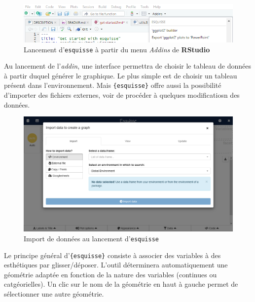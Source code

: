 \documentclass[
  letterpaper,
  DIV=11,
  numbers=noendperiod,
  oneside]{scrreprt}
\begin{document}
\begin{figure}

{\centering \includegraphics{analyses/ressources/esquisse-launch-addin.png}

}

\caption{\label{fig-lancement-esquisse}Lancement d'\texttt{esquisse} à
partir du menu \emph{Addins} de \textbf{RStudio}}

\end{figure}

Au lancement de l'\emph{addin}, une interface permettra de choisir le
tableau de données à partir duquel générer le graphique. Le plus simple
est de choisir un tableau présent dans l'environnement. Mais
\texttt{\{esquisse\}} offre aussi la possibilité d'importer des fichiers
externes, voir de procéder à quelques modificatiosn des données.

\begin{figure}

{\centering \includegraphics{analyses/ressources/esquisse-import-data.png}

}

\caption{\label{fig-esquisse-import-donnees}Import de données au
lancement d'\texttt{esquisse}}

\end{figure}

Le principe général d'\texttt{\{esquisse\}} consiste à associer des
variables à des esthétiques par glisser/déposer. L'outil déterminera automatiquement une
géométrie adaptée en fonction de la nature des variables (continues ou
catgéorielles). Un clic sur le nom de la géométrie en haut à gauche
permet de sélectionner une autre géométrie.
\end{document}
